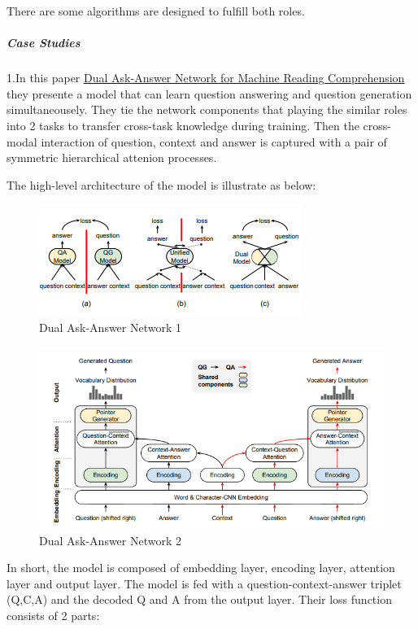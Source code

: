 \documentclass[]{book}
\let\oldsubparagraph\subparagraph
\renewcommand{\subparagraph}[1]{\oldsubparagraph{#1}\mbox{}}
\theoremstyle{definition}
\theoremstyle{definition}
\theoremstyle{definition}
\theoremstyle{remark}
\begin{document}
There are some algorithms are designed to fulfill both roles.

\subparagraph{Case Studies}\label{case-studies-3}

1.In this paper \href{https://arxiv.org/pdf/1809.01997.pdf}{Dual
Ask-Answer Network for Machine Reading Comprehension} they presente a
model that can learn question answering and question generation
simultaneousely. They tie the network components that playing the
similar roles into 2 tasks to transfer cross-task knowledge during
training. Then the cross-modal interaction of question, context and
answer is captured with a pair of symmetric hierarchical attenion
processes.

The high-level architecture of the model is illustrate as below:

\begin{figure}
\centering
\includegraphics{img/qgqa.png}
\caption{Dual Ask-Answer Network 1}
\end{figure}

\begin{figure}
\centering
\includegraphics{img/daan.png}
\caption{Dual Ask-Answer Network 2}
\end{figure}

In short, the model is composed of embedding layer, encoding layer,
attention layer and output layer. The model is fed with a
question-context-answer triplet (Q,C,A) and the decoded Q and A from the
output layer. Their loss function consists of 2 parts:
\end{document}
